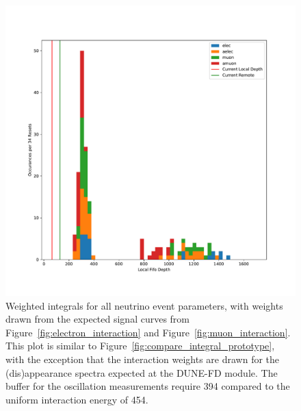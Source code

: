 \begin{figure}[]
\centering
\includegraphics[width=\textwidth]{images/df_weight_pdg_cut.pdf}
\caption{Weighted integrals for all neutrino event parameters, with weights drawn from the expected signal curves from Figure~\ref{fig:electron_interaction} and Figure~\ref{fig:muon_interaction}.
This plot is similar to Figure~\ref{fig:compare_integral_prototype}, with the exception that the interaction weights are drawn for the (dis)appearance spectra expected at the DUNE-FD module.
The buffer for the oscillation measurements require 394 compared to the uniform interaction energy of 454. 
}
\end{figure}~\label{fig:weighted_integrals}